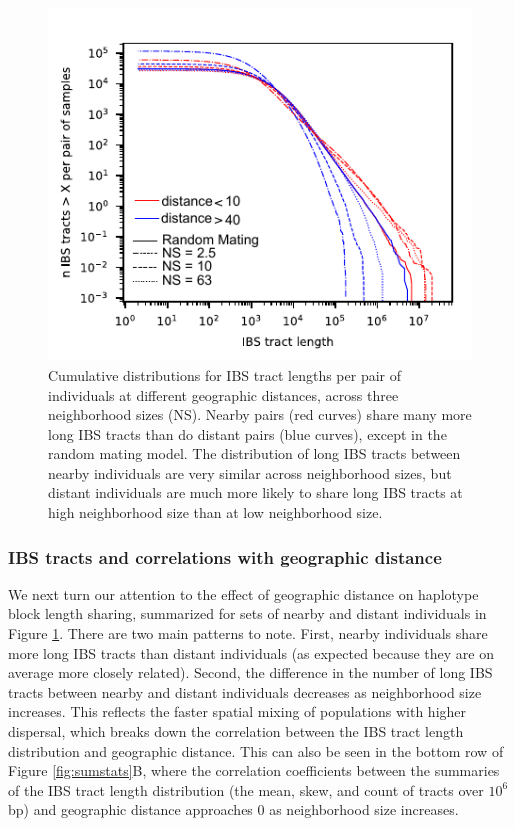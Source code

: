 \documentclass[10pt,twoside,lineno,hidelinks]{preprint}
\begin{document}
\begin{figure}[p]
\centering
\includegraphics[width=.5\textwidth]{figures/ibs_cumdists_w_rm.pdf}
\caption{
    Cumulative distributions for IBS tract lengths per pair of individuals at different geographic distances, across three neighborhood sizes (NS).
    Nearby pairs (red curves) share many more long IBS tracts than do distant pairs (blue curves),
    except in the random mating model.
    The distribution of long IBS tracts between nearby individuals are very similar across neighborhood sizes,
    but distant individuals are much more likely to share long IBS tracts at high neighborhood size
    than at low neighborhood size.
}
\label{fig:ibs}
\end{figure}


\subsubsection{IBS tracts and correlations with geographic distance}

We next turn our attention to the effect of geographic distance on haplotype block length sharing, summarized for sets of nearby and distant individuals in Figure \ref{fig:ibs}. There are two main patterns to note. First, nearby individuals share more long IBS tracts than distant individuals (as expected because they are on average more closely related). Second, the difference in the number of long IBS tracts between nearby and distant individuals decreases as neighborhood size increases. This reflects the faster spatial mixing of populations with higher dispersal, which breaks down the correlation between the IBS tract length distribution and geographic distance. This can also be seen in the bottom row of Figure \ref{fig:sumstats}B, where the correlation coefficients between the summaries of the IBS tract length distribution (the mean, skew, and count of tracts over $10^6$bp) and geographic distance approaches 0 as neighborhood size increases. 
\end{document}
